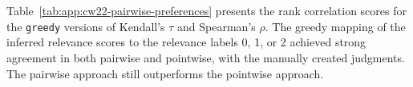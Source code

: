 \\\\
Table~\ref{tab:app:cw22-pairwise-preferences} presents the rank correlation scores for the \texttt{greedy} versions of Kendall's $\tau$ and Spearman's $\rho$. The greedy mapping of the inferred relevance scores to the relevance labels 0, 1, or 2 achieved strong agreement in both pairwise and pointwise, with the manually created judgments. The pairwise approach still outperforms the pointwise approach.


